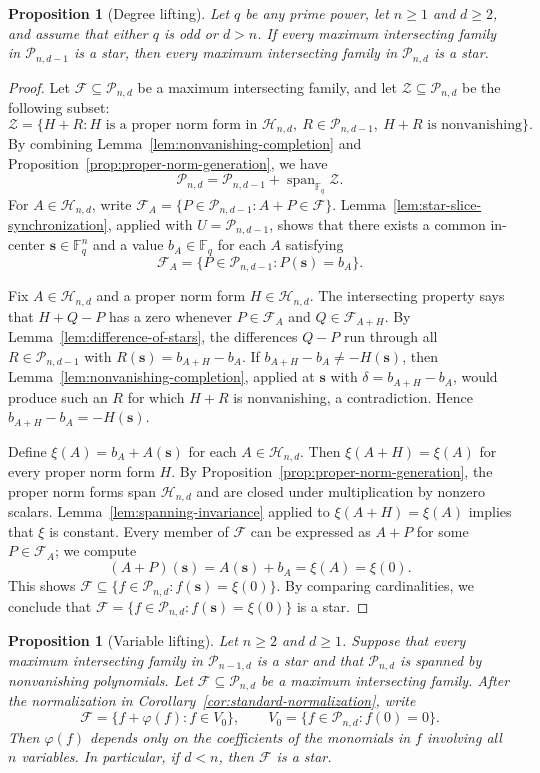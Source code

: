 \documentclass[12pt,reqno]{amsart}
\newtheorem{prop}[thm]{Proposition}
\theoremstyle{definition}
\newcommand{\F}{\mathbb{F}}
\newcommand{\cF}{\mathcal F}
\newcommand{\cH}{\mathcal H}
\newcommand{\cP}{\mathcal P}
\newcommand{\Span}{\operatorname{span}}
\begin{document}
\begin{prop}[Degree lifting]\label{prop:degree-lifting}
Let $q$ be any prime power, let $n\geq1$ and $d\geq2$, and assume that
either $q$ is odd or $d>n$. If every maximum intersecting family in
$\cP_{n,d-1}$ is a star, then every maximum intersecting family in
$\cP_{n,d}$ is a star.
\end{prop}

\begin{proof}
Let $\cF\subseteq\cP_{n,d}$ be a maximum intersecting family, and let
$\mathcal Z\subseteq\cP_{n,d}$ be the following subset:
\[
  \mathcal Z
  =\{H+R:H \text{ is a proper norm form in } \cH_{n,d},\ R\in\cP_{n,d-1},
       \ H+R\text{ is nonvanishing}\}.
\]
By combining Lemma~\ref{lem:nonvanishing-completion} and Proposition~\ref{prop:proper-norm-generation}, we have
\[
  \cP_{n,d}
  =\cP_{n,d-1}+\Span_{\F_q}\mathcal Z.
\]
For $A\in\cH_{n,d}$, write $\cF_A=\{P\in\cP_{n,d-1}:A+P\in\cF\}$. Lemma~\ref{lem:star-slice-synchronization}, applied with $U=\cP_{n,d-1}$, shows that there exists a common in-center $\mathbf s\in\F_q^n$ and a value $b_A\in\F_q$ for each $A$ satisfying
\[
\cF_A=\{P\in\cP_{n,d-1}:P(\mathbf s)=b_A\}.
\]

Fix $A\in\cH_{n,d}$ and a proper norm form $H\in\cH_{n,d}$.
The intersecting property says that $H+Q-P$ has a zero whenever
$P\in\cF_A$ and $Q\in\cF_{A+H}$. By Lemma~\ref{lem:difference-of-stars},
the differences $Q-P$ run through all $R\in\cP_{n,d-1}$ with $R(\mathbf s)=b_{A+H}-b_A$. If $b_{A+H}-b_A\neq-H(\mathbf s)$, then
Lemma~\ref{lem:nonvanishing-completion}, applied at $\mathbf s$ with
$\delta=b_{A+H}-b_A$, would produce such an $R$ for which $H+R$ is
nonvanishing, a contradiction. Hence $b_{A+H}-b_A=-H(\mathbf s)$. 

Define $\xi(A)=b_A+A(\mathbf s)$ for each $A\in\cH_{n,d}$. Then $\xi(A+H)=\xi(A)$ for every proper norm form $H$. By Proposition~\ref{prop:proper-norm-generation}, the proper norm forms
span $\cH_{n,d}$ and are closed under multiplication by nonzero
scalars. Lemma~\ref{lem:spanning-invariance} applied to $\xi(A+H)=\xi(A)$ implies that $\xi$ is constant. Every member of $\cF$ can be expressed as $A+P$ for some $P\in\cF_{A}$; we compute
\[
  (A+P)(\mathbf s)=A(\mathbf s)+b_A=\xi(A)=\xi(0).
\]
This shows $\cF\subseteq \{f\in\cP_{n,d}:f(\mathbf s)=\xi(0)\}$. By comparing cardinalities, we conclude that $\cF=\{f\in\cP_{n,d}:f(\mathbf s)=\xi(0)\}$ is a star.
\end{proof}

\begin{prop}[Variable lifting]
\label{prop:variable-lifting}
Let $n\geq2$ and $d\geq1$. Suppose that every maximum intersecting
family in $\cP_{n-1,d}$ is a star and that $\cP_{n,d}$ is spanned by
nonvanishing polynomials. Let $\cF\subseteq\cP_{n,d}$ be a maximum intersecting family. After
the normalization in Corollary~\ref{cor:standard-normalization}, write
\[
  \cF=\{f+\varphi(f):f\in V_0\},
  \qquad
  V_0=\{f\in\cP_{n,d}:f(0)=0\}.
\]
Then $\varphi(f)$ depends only on the coefficients of the monomials
in $f$ involving all $n$ variables. 
In particular, if $d<n$, then $\cF$ is a star.
\end{prop}
\end{document}
